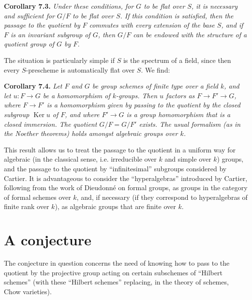 \documentclass{article}
\newenvironment{itenv}[1]
  {\phantomsection\par\medskip\noindent\textbf{#1.}\itshape}
  {\medskip}
\DeclareMathOperator{\Ker}{Ker}
\newcommand{\oldpage}[1]{\marginpar{\footnotesize$\Big\vert$ \textit{p.~#1}}}
\begin{document}
\begin{itenv}{Corollary 7.3}
  Under these conditions, for $G$ to be flat over $S$, it is necessary and sufficient for $G/F$ to be flat over $S$.
  If this condition is satisfied, then the passage to the quotient by $F$ commutes with every extension of the base $S$, and if $F$ is an invariant subgroup of $G$, then $G/F$ can be endowed with the structure of a \emph{quotient group} of $G$ by $F$.
\end{itenv}

The situation is particularly simple if $S$ is the spectrum of a field, since then every $S$-prescheme is automatically flat over $S$.
We find:

\begin{itenv}{Corollary 7.4}
\label{corollary7.4}
  Let $F$ and $G$ be group schemes of finite type over a field $k$, and let $u\colon F\to G$ be a homomorphism of $k$-groups.
  Then $u$ factors as $F\to F'\to G$, where $F\to F'$ is a homomorphism given by passing to the quotient by the closed subgroup $\Ker u$ of $F$, and where $F'\to G$ is a group homomorphism that is a closed immersion.
  The quotient $G/F=G/F'$ exists.
  The usual formalism (as in the Noether theorems) holds amongst algebraic groups over $k$.
\end{itenv}

This result allows us to treat the passage to the quotient in a uniform way for algebraic (in the classical sense, i.e. irreducible over $k$ and simple over $k$) groups, and the passage to the quotient by ``infinitesimal'' subgroups
\oldpage{212-18}
considered by Cartier.
It is advantageous to consider the ``hyperalgebras'' introduced by Cartier, following from the work of Dieudonn\'{e} on formal groups, as groups in the category of formal schemes over $k$, and, if necessary (if they correspond to hyperalgebras of finite rank over $k$), as algebraic groups that are finite over $k$.


\section{A conjecture}
\label{8}

The conjecture in question concerns the need of knowing how to pass to the quotient by the projective group acting on certain subschemes of ``Hilbert schemes'' (with these ``Hilbert schemes'' replacing, in the theory of schemes, Chow varieties).
\end{document}
